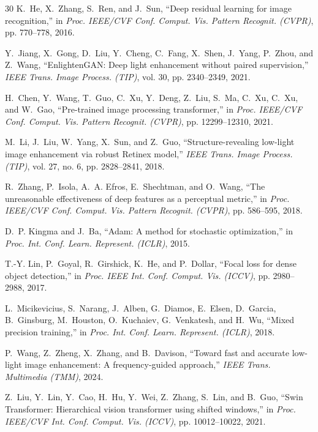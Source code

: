 \documentclass[journal,onecolumn,11pt]{IEEEtran}
\begin{document}
\begin{thebibliography}{30}
K.~He, X.~Zhang, S.~Ren, and J.~Sun, ``Deep residual learning for image recognition,'' in \emph{Proc. IEEE/CVF Conf. Comput. Vis. Pattern Recognit. (CVPR)}, pp. 770--778, 2016.

Y.~Jiang, X.~Gong, D.~Liu, Y.~Cheng, C.~Fang, X.~Shen, J.~Yang, P.~Zhou, and Z.~Wang, ``EnlightenGAN: Deep light enhancement without paired supervision,'' \emph{IEEE Trans. Image Process. (TIP)}, vol. 30, pp. 2340--2349, 2021.

H.~Chen, Y.~Wang, T.~Guo, C.~Xu, Y.~Deng, Z.~Liu, S.~Ma, C.~Xu, C.~Xu, and W.~Gao, ``Pre-trained image processing transformer,'' in \emph{Proc. IEEE/CVF Conf. Comput. Vis. Pattern Recognit. (CVPR)}, pp. 12299--12310, 2021.

M.~Li, J.~Liu, W.~Yang, X.~Sun, and Z.~Guo, ``Structure-revealing low-light image enhancement via robust Retinex model,'' \emph{IEEE Trans. Image Process. (TIP)}, vol. 27, no. 6, pp. 2828--2841, 2018.

R.~Zhang, P.~Isola, A.~A. Efros, E.~Shechtman, and O.~Wang, ``The unreasonable effectiveness of deep features as a perceptual metric,'' in \emph{Proc. IEEE/CVF Conf. Comput. Vis. Pattern Recognit. (CVPR)}, pp. 586--595, 2018.

D.~P. Kingma and J.~Ba, ``Adam: A method for stochastic optimization,'' in \emph{Proc. Int. Conf. Learn. Represent. (ICLR)}, 2015.

T.-Y. Lin, P.~Goyal, R.~Girshick, K.~He, and P.~Dollar, ``Focal loss for dense object detection,'' in \emph{Proc. IEEE Int. Conf. Comput. Vis. (ICCV)}, pp. 2980--2988, 2017.

L.~Micikevicius, S.~Narang, J.~Alben, G.~Diamos, E.~Elsen, D.~Garcia, B.~Ginsburg, M.~Houston, O.~Kuchaiev, G.~Venkatesh, and H.~Wu, ``Mixed precision training,'' in \emph{Proc. Int. Conf. Learn. Represent. (ICLR)}, 2018.

P.~Wang, Z.~Zheng, X.~Zhang, and B.~Davison, ``Toward fast and accurate low-light image enhancement: A frequency-guided approach,'' \emph{IEEE Trans. Multimedia (TMM)}, 2024.

Z.~Liu, Y.~Lin, Y.~Cao, H.~Hu, Y.~Wei, Z.~Zhang, S.~Lin, and B.~Guo, ``Swin Transformer: Hierarchical vision transformer using shifted windows,'' in \emph{Proc. IEEE/CVF Int. Conf. Comput. Vis. (ICCV)}, pp. 10012--10022, 2021.

\end{thebibliography}
\end{document}
